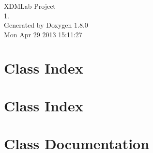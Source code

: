 \documentclass{book}
\begin{document}
\hypersetup{pageanchor=false,citecolor=blue}
\begin{titlepage}
\vspace*{7cm}
\begin{center}
{\Large X\-D\-M\-Lab Project \\[1ex]\large 1. }\\
\vspace*{1cm}
{\large Generated by Doxygen 1.8.0}\\
\vspace*{0.5cm}
{\small Mon Apr 29 2013 15:11:27}\\
\end{center}
\end{titlepage}
\clearemptydoublepage
{}
\tableofcontents
\clearemptydoublepage
{}
\hypersetup{pageanchor=true,citecolor=blue}
\chapter{Class Index}

\chapter{Class Index}

\chapter{Class Documentation}


















\printindex
\end{document}
